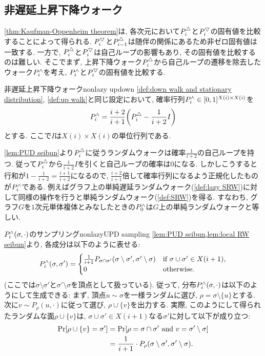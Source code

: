\subsection{非遅延上昇下降ウォーク}
\cref{thm:Kaufman-Oppenheim theorem}は, 各次元において$P^{\triangle}_i$と$P^{\bigtriangledown}_i$の固有値を比較することによって得られる.
$P^{\bigtriangledown}_i$と$P^{\triangle}_{i-1}$は随伴の関係にあるため非ゼロ固有値は一致する.
一方で, $P^{\triangle}_i$と$P^{\bigtriangledown}_i$は自己ループの影響もあり, その固有値を比較するのは難しい.
そこでまず, 上昇下降ウォーク$P^{\triangle}_i$から自己ループの遷移を除去したウォーク$P^{\land}_i$を考え, $P^{\land}_i$と$P^{\bigtriangledown}_i$の固有値を比較する.
\begin{definition}{非遅延上昇下降ウォーク}{nonlazy updown}
    \cref{def:down walk and stationary distribution}, \ref{def:up walk}と同じ設定において, 確率行列$P^{\land}_i \in [0,1]^{X(i) \times X(i)}$を
    \[ \nonlazyPUD_i = \frac{i+2}{i+1}\rbra*{ \PUD_i - \frac{1}{i+2}I } \]
    とする. ここで$I$は$X(i)\times X(i)$の単位行列である.
\end{definition}
\cref{lem:PUD seibun}より$P^{\triangle}_i$に従うランダムウォークは確率$\frac{1}{i+2}$の自己ループを持つ.
従って$P^{\triangle}_i$から$\frac{1}{i+2}I$を引くと自己ループの確率は$0$になる.
しかしこうすると行和が$1-\frac{1}{i+2} = \frac{i+1}{i+2}$になるので, $\frac{i+2}{i+1}$倍して確率行列になるよう正規化したものが$P^{\land}_i$である.
例えばグラフ上の単純遅延ランダムウォーク(\cref{def:lazy SRW})に対して同様の操作を行うと単純ランダムウォーク(\cref{def:SRW})を得る.
すなわち, グラフ$G$を$1$次元単体複体とみなしたときの$P^{\land}_0$は$G$上の単純ランダムウォークと等しい.
\begin{remark}{\texorpdfstring{$P^{\land}_i(\sigma,\cdot)$}{非遅延上昇下降ウォーク}のサンプリング}{nonlazyUPD sampling}
    \cref{lem:PUD seibun,lem:local RW seibun}より, 各成分は以下のように表せる:
    \begin{align*}
        P^{\land}_i(\sigma,\sigma') = \begin{cases}
            \frac{1}{i+1}P_{\sigma\cap \sigma'}(\sigma\setminus\sigma',\sigma'\setminus\sigma)	& \text{if } \sigma\cup\sigma'\in X(i+1),\\
            0 & \text{otherwise}.
        \end{cases}
    \end{align*}
    (ここでは$\sigma\setminus\sigma'$と$\sigma'\setminus\sigma$を頂点として扱っている).
    従って, 分布$P^{\land}_i(\sigma,\cdot)$は以下のようにして生成できる:
    まず, 頂点$u \sim \sigma$を一様ランダムに選び, $\rho = \sigma\setminus\{u\}$とする.
    次に$v\sim P_\rho(u,\cdot)$に従って選び,
    $\rho\cup\{v\}$を出力する.
    実際, このようにして得られたランダムな面$\rho\cup\{v\}$は, $\sigma\cup\sigma'\in X(i+1)$なる$\sigma'$に対して以下が成り立つ:
    \begin{align*}
        \Pr\sbra*{\rho\cup\{v\} = \sigma'} &= \Pr\sbra*{ \rho = \sigma\cap \sigma' \tand v=\sigma'\setminus\sigma } \\
        &= \frac{1}{i+1}\cdot P_{\rho}(\sigma\setminus\sigma',\sigma'\setminus\sigma).
    \end{align*}
\end{remark}




